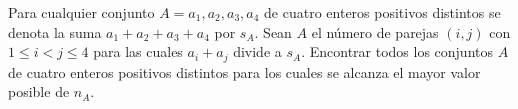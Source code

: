 Para cualquier conjunto $A = {a_1, a_2, a_3, a_4}$ de cuatro enteros positivos distintos se denota la suma $a_1+a_2+a_3+a_4$ por $s_A$. Sean $A$ el número de parejas $(i,j)$ con $1\leq i\lt j\leq 4$ para las cuales $a_i + a_j$ divide a $s_A$. Encontrar todos los conjuntos $A$ de cuatro enteros positivos distintos para los cuales se alcanza el mayor valor posible de $n_A$.
